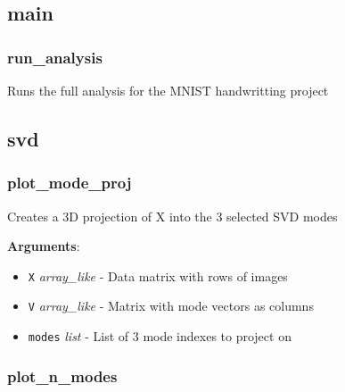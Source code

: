\subsection{main}

\subsubsection{run\_analysis}

\begin{Shaded}
\begin{Highlighting}[]
\end{Highlighting}
\end{Shaded}

Runs the full analysis for the MNIST handwritting project

\subsection{svd}

\subsubsection{plot\_mode\_proj}

\begin{Shaded}
\begin{Highlighting}[]
\end{Highlighting}
\end{Shaded}

Creates a 3D projection of X into the 3 selected SVD modes

\textbf{Arguments}:

\begin{itemize}
\tightlist
\item
  \texttt{X} \emph{array\_like} - Data matrix with rows of images
\item
  \texttt{V} \emph{array\_like} - Matrix with mode vectors as columns
\item
  \texttt{modes} \emph{list} - List of 3 mode indexes to project on
\end{itemize}

\subsubsection{plot\_n\_modes}

\begin{Shaded}
\begin{Highlighting}[]
\end{Highlighting}
\end{Shaded}

